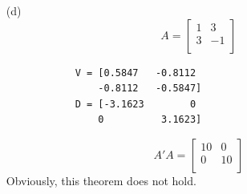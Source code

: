 \documentclass{article}
\begin{document}
\begin{itemize}
        \item[(d)]
        $$A = \begin{bmatrix}
            1 &3\\
            3 &-1\\
        \end{bmatrix}$$
        \begin{lstlisting}
            V = [0.5847   -0.8112
                -0.8112   -0.5847]
            D = [-3.1623        0
                0          3.1623]
        \end{lstlisting}
        $$A'A = \begin{bmatrix}
            10 &0\\
            0  &10\\
        \end{bmatrix}$$
        Obviously, this theorem does not hold.
    \end{itemize}
\end{document}

